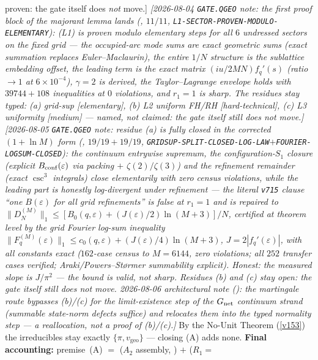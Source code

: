 \begin{keybox}
{proven: the gate itself does \emph{not} move.]}
\emph{[2026-08-04 \texttt{GATE.QGEO} note: the first proof block of the majorant lemma lands
(, $11/11$, \texttt{L1-SECTOR-PROVEN-MODULO-ELEMENTARY}):
(L1) is proven modulo elementary steps for all $6$ undressed sectors on the fixed grid --- the
occupied-arc mode sums are \emph{exact} geometric sums (exact summation replaces Euler--Maclaurin), the
entire $1/N$ structure is the sublattice embedding offset, the leading term is the exact matrix
$(iu/2MN)f_q'(s)$ (ratio $\to1$ at $6\times10^{-4}$), $\gamma=2$ is \emph{derived}, the Taylor--Lagrange
envelope holds with $39744{+}108$ inequalities at $0$ violations, and $r_1=1$ is sharp.  The residues stay
typed: (a) grid-sup [elementary], (b) L2 uniform FH/RH [hard-technical], (c) L3 uniformity [medium] ---
named, not claimed: the gate itself still does \emph{not} move.]}
\emph{[2026-08-05 \texttt{GATE.QGEO} note: residue (a) is \emph{fully closed} in the corrected
$(1+\ln M)$ form (, $19/19+19/19$,
\texttt{GRIDSUP-SPLIT-CLOSED-LOG-LAW}$+$\texttt{FOURIER-LOGSUM-CLOSED}): the continuum entrywise
supremum, the configuration-$S_1$ closure (explicit $B_{\rm conf}(\varepsilon)$ via packing $+$
$\zeta(2)/\zeta(3)$) and the refinement remainder (exact $\csc^3$ integrals) close elementarily with
zero census violations, while the leading part is honestly \emph{log-divergent} under refinement ---
the literal \texttt{v715} clause ``one $B(\varepsilon)$ for \emph{all} grid refinements'' is false at
$r_1=1$ and is repaired to $\|D_N^{(M)}\|_1\le[B_0(q,\varepsilon)+(J(\varepsilon)/2)\ln(M{+}3)]/N$,
certified at theorem level by the grid Fourier log-sum inequality
$\|F_q^{(M)}(\varepsilon)\|_1\le c_0(q,\varepsilon)+(J(\varepsilon)/4)\ln(M{+}3)$,
$J=2|f_q'(\varepsilon)|$, with all constants exact ($162$-case census to $M=6144$, zero violations;
all $252$ transfer cases verified; Araki/Powers--St\o rmer summability explicit).  Honest: the
measured slope is $J/\pi^2$ --- the bound is valid, not sharp.  Residues (b) and (c) stay open: the
gate itself still does \emph{not} move.  2026-08-06 architectural note
(): the martingale route bypasses (b)/(c) for the
limit-\emph{existence} step of the $G_{\rm net}$ continuum strand (summable state-norm defects
suffice) and relocates them into the typed normality step --- a reallocation, not a proof of
(b)/(c).]}
By the No-Unit Theorem (\vref{v153}) the irreducibles stay exactly $\{\pi,v_{\mathrm{geo}}\}$ --- closing
(A) adds none. \textbf{Final accounting:} premise~(A) $=$ ($A_2$ assembly, \mC) $+$ ($R_1{=}$%

\end{keybox}
